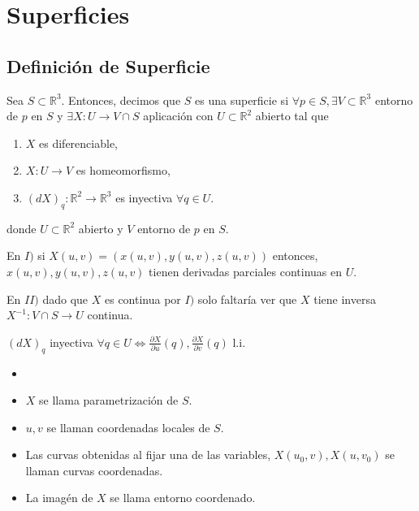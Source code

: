 \chapter{Superficies}

\section{Definición de Superficie}

\begin{defn}[Superficies]
  Sea $S \subset \mathbb{R}^{3}$. Entonces, decimos que $S$ es una superficie si $\forall p \in S, \exists V \subset \mathbb{R}^{3}$ entorno de $p$ en $S$ y $\exists X: U \to V \cap S$ aplicación con $U \subset \mathbb{R}^{2}$ abierto tal que
  \begin{enumerate}[label=(\roman*)]
    \item $X$ es diferenciable, 
    \item $X: U \to V$ es homeomorfismo,
    \item $(dX)_{q} : \mathbb{R}^{2} \to \mathbb{R}^{3}$ es inyectiva $ \forall q \in U$.
  \end{enumerate}
  donde $U \subset \mathbb{R}^{2}$ abierto y $V$ entorno de $p$ en $S$.
\end{defn}

\begin{obs}
  En $I)$ si $X(u, v) = (x(u, v), y(u, v), z(u, v))$ entonces, $x(u, v), y(u, v), z(u, v)$ tienen derivadas parciales continuas en $U$.
\end{obs}

\begin{obs}
  En $II)$ dado que $X$ es continua por $I)$ solo faltaría ver que $X$ tiene inversa $X^{-1}: V \cap S \to U$ continua.
\end{obs}


\begin{obs}
  $(dX)_{q}$ inyectiva $\forall q \in U \Leftrightarrow \frac{\partial{X}}{\partial{u}}(q), \frac{\partial{X}}{\partial{v}}(q)$ l.i.
\end{obs}

\begin{nota}
  \begin{itemize}
    \item []
    \item $X$ se llama parametrización de $S$.
    \item $u, v$ se llaman coordenadas locales de $S$.
    \item Las curvas obtenidas al fijar una de las variables, $X(u_{0}, v), X(u, v_{0})$ se llaman curvas coordenadas.
    \item La imagén de $X$ se llama entorno coordenado.
  \end{itemize}
\end{nota} 

